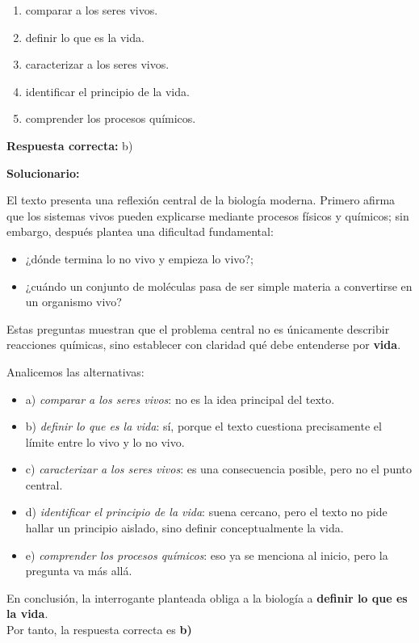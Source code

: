 \begin{enumerate}[resume]
	\begin{enumerate}[label=\alph*)]
		\item comparar a los seres vivos.
		\item definir lo que es la vida.
		\item caracterizar a los seres vivos.
		\item identificar el principio de la vida.
		\item comprender los procesos químicos.
	\end{enumerate}
	
	\textbf{Respuesta correcta:} b)
	
	\vspace{2mm}
	\textbf{Solucionario:}
	
	El texto presenta una reflexión central de la biología moderna. Primero afirma que los sistemas vivos pueden explicarse mediante procesos físicos y químicos; sin embargo, después plantea una dificultad fundamental:
	
	\begin{itemize}[label=--]
		\item ¿dónde termina lo no vivo y empieza lo vivo?;
		\item ¿cuándo un conjunto de moléculas pasa de ser simple materia a convertirse en un organismo vivo?
	\end{itemize}
	
	Estas preguntas muestran que el problema central no es únicamente describir reacciones químicas, sino establecer con claridad qué debe entenderse por \textbf{vida}.
	
	Analicemos las alternativas:
	
	\begin{itemize}[label=--]
		\item a) \textit{comparar a los seres vivos}: no es la idea principal del texto.
		\item b) \textit{definir lo que es la vida}: sí, porque el texto cuestiona precisamente el límite entre lo vivo y lo no vivo.
		\item c) \textit{caracterizar a los seres vivos}: es una consecuencia posible, pero no el punto central.
		\item d) \textit{identificar el principio de la vida}: suena cercano, pero el texto no pide hallar un principio aislado, sino definir conceptualmente la vida.
		\item e) \textit{comprender los procesos químicos}: eso ya se menciona al inicio, pero la pregunta va más allá.
	\end{itemize}
	
	En conclusión, la interrogante planteada obliga a la biología a \textbf{definir lo que es la vida}.\\
	Por tanto, la respuesta correcta es \textbf{b)}
	
\end{enumerate}


